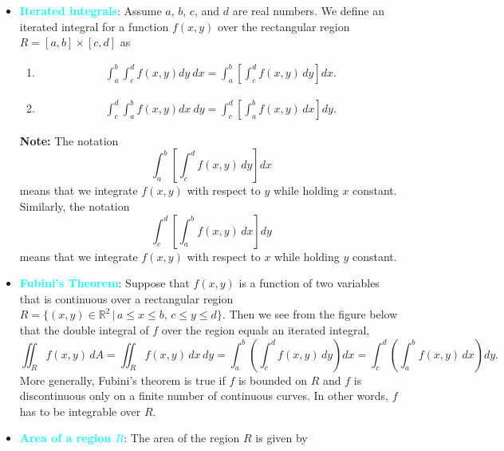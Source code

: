 \documentclass{report}
\begin{document}
\begin{itemize}
        \item \textbf{\textcolor{cyan}{Iterated integrals}}:
            Assume $a$, $b$, $c$, and $d$ are real numbers. We define an iterated integral for a function $f(x,y)$ over the rectangular region $R = [a,b] \times [c,d]$ as
            \begin{enumerate}[label=(\alph*)]
                \item \relax
                \begin{align*}
                    \int_{a}^{b} \int_{c}^{d} f(x,y) dy\ dx = \int_{a}^{b} \left[ \int_{c}^{d} f(x,y) \, dy \right] dx
                .\end{align*}
            \item \relax
                \begin{align*}
                    \int_{c}^{d} \int_{a}^{b} f(x,y) dx\ dy = \int_{c}^{d} \left[ \int_{a}^{b} f(x,y) \, dx \right] dy
                .\end{align*}
            \end{enumerate}
            \bigbreak \noindent 
            \textbf{Note:} The notation 
            \[
                \int_{a}^{b} \left[ \int_{c}^{d} f(x,y) \, dy \right] dx
            \]
            means that we integrate $f(x,y)$ with respect to $y$ while holding $x$ constant. Similarly, the notation 
            \[
                \int_{c}^{d} \left[ \int_{a}^{b} f(x,y) \, dx \right] dy
            \]
            means that we integrate $f(x,y)$ with respect to $x$ while holding $y$ constant.
        \item \textbf{\textcolor{cyan}{Fubini’s Theorem}}:
            Suppose that $f(x,y)$ is a function of two variables that is continuous over a rectangular region $R = \{(x,y) \in \mathbb{R}^2 \,|\, a \leq x \leq b, \, c \leq y \leq d\}$. Then we see from the figure below that the double integral of $f$ over the region equals an iterated integral,
            \[
                \iint_{R} f(x,y) \, dA = \iint_{R} f(x,y) \, dx \, dy = \int_{a}^{b} \left( \int_{c}^{d} f(x,y) \, dy \right) dx = \int_{c}^{d} \left( \int_{a}^{b} f(x,y) \, dx \right) dy.
            \]
            More generally, Fubini’s theorem is true if $f$ is bounded on $R$ and $f$ is discontinuous only on a finite number of continuous curves. In other words, $f$ has to be integrable over $R$.
            \bigbreak \noindent 
        \item \textbf{\textcolor{cyan}{Area of a region $R$}}:
            The area of the region $R$ is given by  

\end{itemize}
\end{document}
